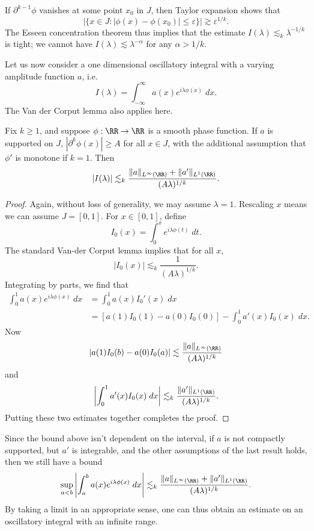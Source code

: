 \begin{remark}
    If $\partial^{k-1} \phi$ vanishes at some point $x_0$ in $J$, then Taylor expansion shows that
    \[ |\{ x \in J : |\phi(x) - \phi(x_0)| \leq \varepsilon \}| \gtrsim \varepsilon^{1/k}. \]
    The Esseen concentration theorem thus implies that the estimate $I(\lambda) \lesssim_k \lambda^{-1/k}$ is tight; we cannot have $I(\lambda) \lesssim \lambda^{-\alpha}$ for any $\alpha > 1/k$.
\end{remark}

Let us now consider a one dimensional oscillatory integral with a varying amplitude function $a$, i.e.
%
\[ I(\lambda) = \int_{-\infty}^\infty a(x) e^{i \lambda \phi(x)}\; dx. \]
%
The Van der Corput lemma also applies here.

\begin{lemma}
  Fix $k \geq 1$, and suppose $\phi: \RR \to \RR$ is a smooth phase function. If $a$ is supported on $J$, $|\partial^k \phi(x)| \geq A$ for all $x \in J$, with the additional assumption that $\phi'$ is monotone if $k = 1$. Then
  \[ |I(\lambda)| \lesssim_k \frac{\| a \|_{L^\infty(\RR)} + \| a' \|_{L^1(\RR)}}{(A \lambda)^{1/k}}. \]
\end{lemma}
\begin{proof}
  Again, without loss of generality, we may assume $\lambda = 1$. Rescaling $x$ means we can assume $J = [0,1]$. For $x \in [0,1]$, define
  \[ I_0(x) = \int_0^x e^{i \lambda \phi(t)}\; dt. \]
  The standard Van-der Corput lemma implies that for all $x$,
  \[ |I_0(x)| \lesssim_k \frac{1}{(A \lambda)^{1/k}}. \]
  Integrating by parts, we find that
  \begin{align*}
    \int_0^1 a(x) e^{i \lambda \phi(x)}\; dx &= \int_0^1 a(x) I_0'(x)\; dx\\
    &= [a(1) I_0(1) - a(0) I_0(0)] - \int_0^1 a'(x) I_0(x)\; dx.
  \end{align*}
  Now
  \[ |a(1) I_0(b) - a(0) I_0(a)| \lesssim \frac{\| a \|_{L^\infty(\RR)}}{(A \lambda)^{1/k}} \]
  and
  \[ \left| \int_0^1 a'(x) I_0(x)\; dx \right| \lesssim_k \frac{\| a' \|_{L^1(\RR)}}{(A \lambda)^{1/k}}. \]
  Putting these two estimates together completes the proof.
\end{proof}

\begin{remark}
    Since the bound above isn't dependent on the interval, if $a$ is not compactly supported, but $a'$ is integrable, and the other assumptions of the last result holds, then we still have a bound
    \[ \sup_{a < b} \left| \int_a^b a(x) e^{i \lambda \phi(x)}\; dx \right| \lesssim_k \frac{\| a \|_{L^\infty(\RR)} + \| a' \|_{L^1(\RR)}}{(A\lambda)^{1/k}}. \]
    By taking a limit in an appropriate sense, one can thus obtain an estimate on an oscillatory integral with an infinite range.
\end{remark}


